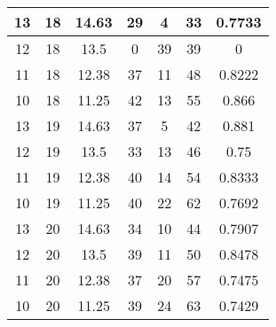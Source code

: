 \documentclass[letterpaper, 12pt]{article}
\begin{document}
\begin{longtable}{|c|c|c|c|c|c|c|}
\hline
13 & 18 & 14.63 & 29 & 4 & 33 & 0.7733 \\
\hline
12 & 18 & 13.5 & 0 & 39 & 39 & 0 \\
\hline
11 & 18 & 12.38 & 37 & 11 & 48 & 0.8222 \\
\hline
10 & 18 & 11.25 & 42 & 13 & 55 & 0.866 \\
\hline
13 & 19 & 14.63 & 37 & 5 & 42 & 0.881 \\
\hline
12 & 19 & 13.5 & 33 & 13 & 46 & 0.75 \\
\hline
11 & 19 & 12.38 & 40 & 14 & 54 & 0.8333 \\
\hline
10 & 19 & 11.25 & 40 & 22 & 62 & 0.7692 \\
\hline
13 & 20 & 14.63 & 34 & 10 & 44 & 0.7907 \\
\hline
12 & 20 & 13.5 & 39 & 11 & 50 & 0.8478 \\
\hline
11 & 20 & 12.38 & 37 & 20 & 57 & 0.7475 \\
\hline
10 & 20 & 11.25 & 39 & 24 & 63 & 0.7429 \\
\hline
\end{longtable}
\end{document}

